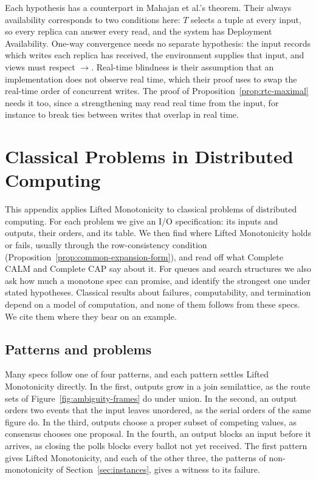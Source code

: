 \documentclass[sigconf]{cidr-2027}
\theoremstyle{remark}
\newcommand{\spectype}[1][]{I/O specification#1\xspace}
\begin{document}
Each hypothesis has a counterpart in Mahajan et al.'s theorem. Their always
availability corresponds to two conditions here: $T$ selects a tuple at every
input, so every replica can answer every read, and the system has Deployment
Availability. One-way convergence needs no separate hypothesis: the input
records which writes each replica has received, the environment supplies that
input, and views must respect $\to$. Real-time blindness is their assumption
that an implementation does not observe real time, which their proof uses to
swap the real-time order of concurrent writes. The proof of
Proposition~\ref{prop:rtc-maximal} needs it too, since a strengthening may read
real time from the input, for instance to break ties between writes that
overlap in real time.

\section{Classical Problems in Distributed Computing}
\label{app:additional-applications}

This appendix applies Lifted Monotonicity to classical problems of
distributed computing. For each problem we give an \spectype: its inputs and
outputs, their orders, and its table. We then find where Lifted Monotonicity
holds or fails, usually through the row-consistency condition
(Proposition~\ref{prop:common-expansion-form}), and read off what Complete
CALM and Complete CAP say about it. For queues and search structures we also
ask how much a monotone spec can promise, and identify the strongest one under
stated hypotheses. Classical results about failures, computability, and
termination depend on a model of computation, and none of them follows from
these specs. We cite them where they bear on an example.

\subsection{Patterns and problems}
\label{app:classical-patterns}

Many specs follow one of four patterns, and each pattern settles Lifted
Monotonicity directly. In the first, outputs grow in a join semilattice, as
the route sets of Figure~\ref{fig:ambiguity-frames} do under union. In the
second, an output orders two events that the input leaves unordered, as the
serial orders of the same figure do. In the third, outputs choose a proper
subset of competing values, as consensus chooses one proposal. In the fourth,
an output blocks an input before it arrives, as closing the polls blocks every
ballot not yet received. The first pattern gives Lifted Monotonicity, and
each of the other three, the patterns of non-monotonicity of
Section~\ref{sec:instances}, gives a witness to its failure.
\end{document}
